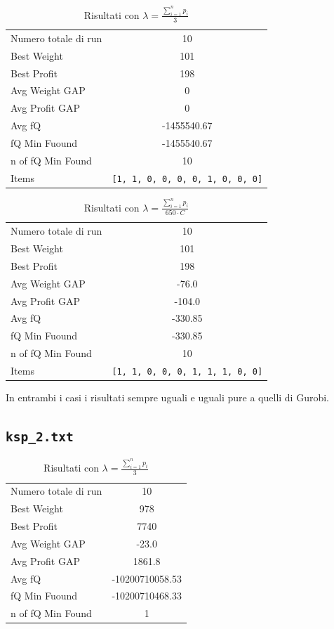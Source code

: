 \documentclass[a4paper,12pt]{article}
\begin{document}
\begin{table}[H]
\centering
\begin{tabular}{lc}
\toprule
Numero totale di run & 10 \\
Best Weight & 101 \\
Best Profit & 198 \\
Avg Weight GAP & 0 \\
Avg Profit GAP & 0 \\
Avg fQ & -1455540.67 \\
fQ Min Fuound & -1455540.67 \\
n of fQ Min Found & 10 \\
Items & \texttt{[1, 1, 0, 0, 0, 0, 1, 0, 0, 0]} \\
\bottomrule
\end{tabular}
\caption{Risultati con $\lambda = \displaystyle \frac{\sum_{i=1}^{n} p_i}{3}$}
\end{table}

\begin{table}[H]
\centering
\begin{tabular}{lc}
\toprule
Numero totale di run & 10 \\
Best Weight & 101 \\
Best Profit & 198 \\
Avg Weight GAP & -76.0 \\
Avg Profit GAP & -104.0 \\
Avg fQ & -330.85 \\
fQ Min Fuound & -330.85 \\
n of fQ Min Found & 10 \\
Items & \texttt{[1, 1, 0, 0, 0, 1, 1, 1, 0, 0]} \\
\bottomrule
\end{tabular}
\caption{Risultati con $\lambda = \displaystyle \frac{\sum_{i=1}^{n} p_i}{650 \cdot C}$}
\end{table}

In entrambi i casi i risultati sempre uguali e uguali pure a quelli di Gurobi.

\subsection{\texttt{ksp\_2.txt}}

\begin{table}[H]
\centering
\begin{tabular}{lc}
\toprule
Numero totale di run & 10 \\
Best Weight & 978 \\
Best Profit & 7740 \\
Avg Weight GAP & -23.0 \\
Avg Profit GAP & 1861.8 \\
Avg fQ & -10200710058.53 \\
fQ Min Fuound & -10200710468.33 \\
n of fQ Min Found & 1 \\
\bottomrule
\end{tabular}
\caption{Risultati con $\lambda = \displaystyle \frac{\sum_{i=1}^{n} p_i}{3}$}
\end{table}
\end{document}
